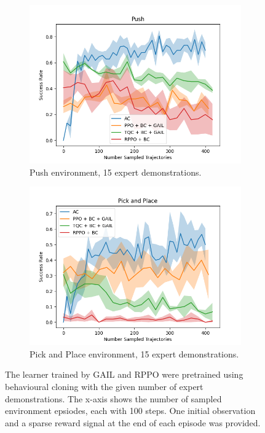 \begin{figure}[htbp]
\begin{subfigure}[t]{0.45\textwidth}
      \includegraphics[width=\textwidth]{images/FineTuning/Push.png}
      \caption{Push environment, 15 expert demonstrations.}
      \label{fig:plot2}
    \end{subfigure}
    \begin{subfigure}[t]{0.45\textwidth}
      \includegraphics[width=\textwidth]{images/FineTuning/Pick and Place.png}
      \caption{Pick and Place environment, 15 expert demonstrations.}
      \label{fig:plot4}
    \end{subfigure}
    \caption{
    The learner trained by GAIL and RPPO were pretrained using behavioural cloning with the given number of expert demonstrations. 
    The x-axis shows the number of sampled environment epsiodes, each with 100 steps.  One initial observation and a sparse reward signal at the end of each episode was provided.}
    \label{fig:finetuning}
\end{figure}

